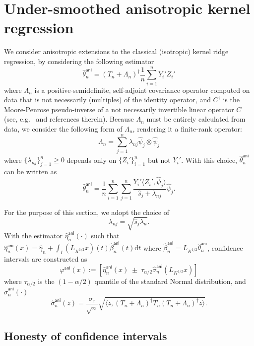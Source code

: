 \documentclass[aos]{imsart}
\renewcommand{\hat}{\widehat}
\newcommand{\ud}{\mathrm d}
\newcommand{\ani}{\mathsf{ani}}
\theoremstyle{plain}
\theoremstyle{definition}
\theoremstyle{definition}
\begin{document}
\section{Under-smoothed anisotropic kernel regression}\label{sec:anikrr}

We consider anisotropic extensions to the classical (isotropic) kernel ridge regression, by considering the following estimator
$$
\hat\theta_n^\ani = (T_n+\Lambda_n)^{\dagger}\frac{1}{n}\sum_{i=1}^n Y_i' Z_i'
$$
where $\Lambda_n$ is a positive-semidefinite, self-adjoint covariance operator computed on data that is not necessarily (multiples) of the identity operator,
and $C^\dagger$ is the Moore-Penrose pseudo-inverse of a not necessarily invertible linear operator $C$ (see, e.g.~\citep{fongi2023moore} and references therein).
Because $\Lambda_n$ must be entirely calculated from data, we consider the following form of $\Lambda_n$, rendering it a finite-rank operator:
$$
\Lambda_n = \sum_{j=1}^n \lambda_{nj}\hat\psi_j\otimes\hat\psi_j
$$
where $\{\lambda_{nj}\}_{j=1}^n\geq 0$ depends only on $\{Z_i'\}_{i=1}^n$ but not $Y_i'$.
With this choice, $\hat\theta_n^\ani$ can be written as
$$
\hat\theta_n^\ani = \frac{1}{n}\sum_{i=1}^n\sum_{j=1}^n \frac{Y_i'\langle Z_i',\hat\psi_j\rangle}{\hat s_j+\lambda_{nj}}\hat\psi_j.
$$

For the purpose of this section, we adopt the choice of 
$$
\lambda_{nj} =  \sqrt{\hat s_j\lambda_n}.
$$
With the estimator $\hat\eta^\ani_n(\cdot)$ such that $\hat\eta^\ani_n(x)=\hat\gamma_n+\int_I (L_{K^{1/2}}x)(t)\hat\beta^\ani_n(t)\ud t$  where $\hat\beta_n^\ani=L_{K^{1/2}}\hat\theta_n^\ani$, confidence intervals are constructed as
$$
\varphi^\ani(x) := [\hat\eta^\ani_n(x)\;\pm\;\tau_{\alpha/2}\hat\sigma_n^\ani(L_{K^{1/2}}x)]
$$
where $\tau_{\alpha/2}$ is the $(1-\alpha/2)$ quantile of the standard Normal distribution, and $\hat\sigma_n^\ani(\cdot)$ 
$$
\hat\sigma_n^\ani(z) = \frac{\sigma_\varepsilon}{\sqrt{n}}\sqrt{\langle z, (T_n+\Lambda_n)^{\dagger}T_n(T_n+\Lambda_n)^\dagger z\rangle}.
$$

\subsection{Honesty of confidence intervals}
\end{document}
